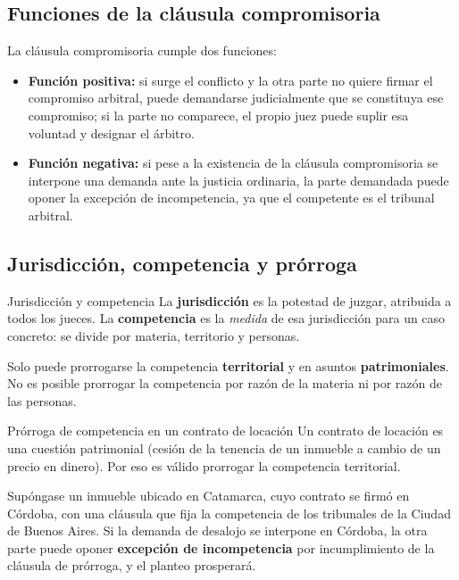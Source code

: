 \documentclass[12pt,oneside]{book}
\begin{document}
\subsection{Funciones de la cl\'ausula compromisoria}

La cláusula compromisoria cumple dos funciones:

\begin{itemize}
    \item \textbf{Función positiva:} si surge el conflicto y la otra
    parte no quiere firmar el compromiso arbitral, puede demandarse
    judicialmente que se constituya ese compromiso; si la parte no
    comparece, el propio juez puede suplir esa voluntad y designar
    el árbitro.
    \item \textbf{Función negativa:} si pese a la existencia de la
    cláusula compromisoria se interpone una demanda ante la justicia
    ordinaria, la parte demandada puede oponer la excepción de
    incompetencia, ya que el competente es el tribunal arbitral.
\end{itemize}

\subsection{Jurisdicci\'on, competencia y pr\'orroga}

\begin{definition}{Jurisdicci\'on y competencia}
La \textbf{jurisdicción} es la potestad de juzgar, atribuida a todos
los jueces. La \textbf{competencia} es la \textit{medida} de esa
jurisdicción para un caso concreto: se divide por materia, territorio
y personas.
\end{definition}

Solo puede prorrogarse la competencia \textbf{territorial} y en asuntos
\textbf{patrimoniales}. No es posible prorrogar la competencia por
razón de la materia ni por razón de las personas.

\begin{example}{Pr\'orroga de competencia en un contrato de locaci\'on}
Un contrato de locación es una cuestión patrimonial (cesión de la
tenencia de un inmueble a cambio de un precio en dinero). Por eso es
válido prorrogar la competencia territorial.

Supóngase un inmueble ubicado en Catamarca, cuyo contrato se firmó en
Córdoba, con una cláusula que fija la competencia de los tribunales
de la Ciudad de Buenos Aires. Si la demanda de desalojo se interpone
en Córdoba, la otra parte puede oponer \textbf{excepción de
incompetencia} por incumplimiento de la cláusula de prórroga, y el
planteo prosperará.
\end{example}
\end{document}

